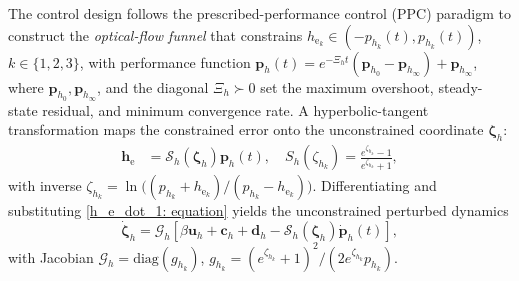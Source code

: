\documentclass{IEEEtaes}
\begin{document}
The control design follows the prescribed-performance control (PPC) paradigm \cite{lin2022} to construct the \emph{optical-flow funnel} that constrains $h_{\text{e}_k}\in(-p_{h_k}(t),p_{h_k}(t))$, $k\in\{1,2,3\}$, with performance function $\boldsymbol{p}_h(t) = e^{-\Xi_h t}(\boldsymbol{p}_{h_0}-\boldsymbol{p}_{h_\infty})+\boldsymbol{p}_{h_\infty}$, where $\boldsymbol{p}_{h_0},\boldsymbol{p}_{h_\infty}$, and the diagonal $\Xi_h\succ 0$ set the maximum overshoot, steady-state residual, and minimum convergence rate. A hyperbolic-tangent transformation maps the constrained error onto the unconstrained coordinate $\boldsymbol{\zeta}_h$:
\begin{align}
    \label{optical flow error transformation: equation}
    \boldsymbol{h}_\text{e} &= \mathcal{S}_h(\boldsymbol{\zeta}_h)\boldsymbol{p}_h(t),\quad S_h(\zeta_{h_k}) = \frac{e^{\zeta_{h_k}}-1}{e^{\zeta_{h_k}}+1},
\end{align}
with inverse $\zeta_{h_k}=\ln\!\big((p_{h_k}+h_{\text{e}_k})/(p_{h_k}-h_{\text{e}_k})\big)$. Differentiating and substituting \eqref{h_e_dot_1: equation} yields the unconstrained perturbed dynamics
\begin{equation} \label{unconstrained system: equation}
    \dot{\boldsymbol{\zeta}}_h = \mathcal{G}_h\!\left[\beta\boldsymbol{u}_h + \boldsymbol{c}_h + \boldsymbol{d}_h - \mathcal{S}_h(\boldsymbol{\zeta}_h)\dot{\boldsymbol{p}}_h(t)\right],
\end{equation}
with Jacobian $\mathcal{G}_h=\text{diag}(g_{h_k})$, $g_{h_k}=(e^{\zeta_{h_k}}+1)^2/(2e^{\zeta_{h_k}}p_{h_k})$.
\end{document}
